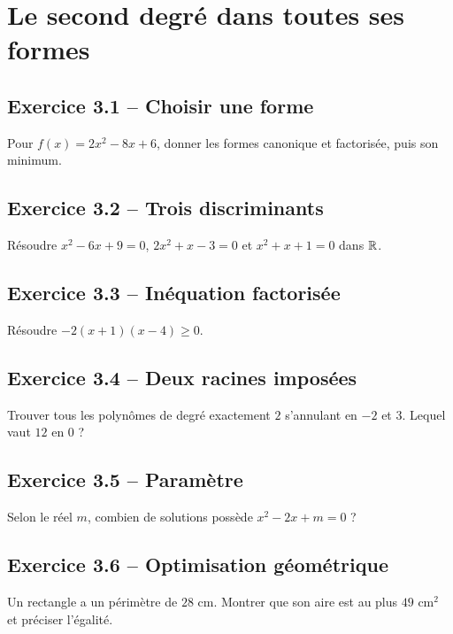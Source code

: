 \chapter{Le second degré dans toutes ses formes}
\section*{Exercice 3.1 -- Choisir une forme}
Pour $f(x)=2x^2-8x+6$, donner les formes canonique et factorisée, puis son minimum.

\section*{Exercice 3.2 -- Trois discriminants}
Résoudre $x^2-6x+9=0$, $2x^2+x-3=0$ et $x^2+x+1=0$ dans $\mathbb{R}$.

\section*{Exercice 3.3 -- Inéquation factorisée}
Résoudre $-2(x+1)(x-4)\ge0$.

\section*{Exercice 3.4 -- Deux racines imposées}
Trouver tous les polynômes de degré exactement $2$ s'annulant en $-2$ et $3$. Lequel vaut $12$ en $0$ ?

\section*{Exercice 3.5 -- Paramètre}
Selon le réel $m$, combien de solutions possède $x^2-2x+m=0$ ?

\section*{Exercice 3.6 -- Optimisation géométrique}
Un rectangle a un périmètre de $28$ cm. Montrer que son aire est au plus $49$ cm$^2$ et préciser l'égalité.
